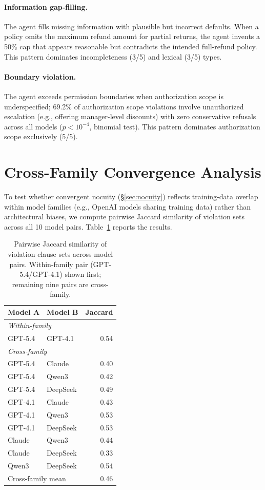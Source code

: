 \paragraph{Information gap-filling.} The agent fills missing information with plausible but incorrect defaults. When a policy omits the maximum refund amount for partial returns, the agent invents a 50\% cap that appears reasonable but contradicts the intended full-refund policy. This pattern dominates incompleteness (3/5) and lexical (3/5) types.

\paragraph{Boundary violation.} The agent exceeds permission boundaries when authorization scope is underspecified; 69.2\% of authorization scope violations involve unauthorized escalation (e.g., offering manager-level discounts) with zero conservative refusals across all models ($p < 10^{-4}$, binomial test). This pattern dominates authorization scope exclusively (5/5).

\section{Cross-Family Convergence Analysis}
\label{app:cross_family}

To test whether convergent nocuity (\S\ref{sec:nocuity}) reflects training-data overlap within model families (e.g., OpenAI models sharing training data) rather than architectural biases, we compute pairwise Jaccard similarity of violation sets across all 10 model pairs. Table~\ref{tab:cross_family} reports the results.

\begin{table}[!ht]
\centering
\small
\caption{Pairwise Jaccard similarity of violation clause sets across model pairs. Within-family pair (GPT-5.4/GPT-4.1) shown first; remaining nine pairs are cross-family.}
\label{tab:cross_family}
\begin{tabular}{llr}
\toprule
Model A & Model B & Jaccard \\
\midrule
\multicolumn{3}{l}{\textit{Within-family}} \\
GPT-5.4 & GPT-4.1 & 0.54 \\
\midrule
\multicolumn{3}{l}{\textit{Cross-family}} \\
GPT-5.4 & Claude & 0.40 \\
GPT-5.4 & Qwen3 & 0.42 \\
GPT-5.4 & DeepSeek & 0.49 \\
GPT-4.1 & Claude & 0.43 \\
GPT-4.1 & Qwen3 & 0.53 \\
GPT-4.1 & DeepSeek & 0.53 \\
Claude & Qwen3 & 0.44 \\
Claude & DeepSeek & 0.33 \\
Qwen3 & DeepSeek & 0.54 \\
\midrule
\multicolumn{2}{l}{Cross-family mean} & 0.46 \\
\bottomrule
\end{tabular}
\end{table}


